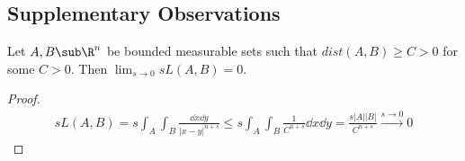 \documentclass[../main.tex]{subfiles}
\begin{document}
\begin{figure}[H]
    
\end{figure}


\subsection{Supplementary Observations}
\begin{lemma}
    Let $ A, B\sub \R^{n} $ be bounded measurable sets such that $ dist(A,B)\geq C > 0  $ for some $ C>0 $. Then $ \lim_{s\to0} sL(A,B) = 0 $.
\end{lemma}

\begin{proof}
    \begin{align*}
        sL(A,B) = s\int_{A}\int_{B} \frac{\dd{x}\dd{y}}{|x-y|^{n+s}} \leq s\int_{A} \int_{B} \frac{1}{C^{n+s}}\dd{x}\dd{y} = \frac{s |A| |B|}{C^{n+s}} \xrightarrow{s\to0} 0
    \end{align*}
\end{proof}




%
%

%
%

\end{document}
